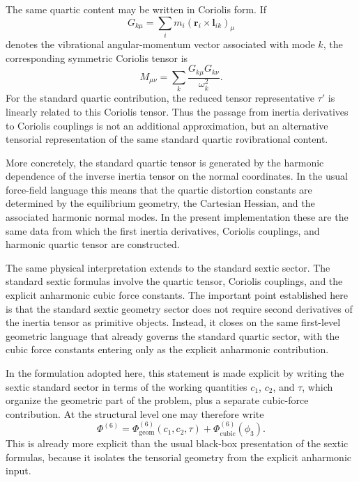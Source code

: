 The same quartic content may be written in Coriolis form. If
\begin{equation}
G_{k\mu}=\sum_i m_i\left(\mathbf r_i\times \mathbf l_{ik}\right)_\mu
\end{equation}
denotes the vibrational angular-momentum vector associated with mode
$k$, the corresponding symmetric Coriolis tensor is
\begin{equation}
M_{\mu\nu}=\sum_k\frac{G_{k\mu}G_{k\nu}}{\omega_k^2}.
\end{equation}
For the standard quartic contribution, the reduced tensor
representative $\tau'$ is linearly related to this Coriolis tensor.
Thus the passage from inertia derivatives to Coriolis couplings is not
an additional approximation, but an alternative tensorial
representation of the same standard quartic rovibrational content.

More concretely, the standard quartic tensor is generated by the
harmonic dependence of the inverse inertia tensor on the normal
coordinates. In the usual force-field language this means that the
quartic distortion constants are determined by the equilibrium
geometry, the Cartesian Hessian, and the associated harmonic normal
modes. In the present implementation these are the same data from
which the first inertia derivatives, Coriolis couplings, and harmonic
quartic tensor are constructed.

The same physical interpretation extends to the standard sextic
sector. The standard sextic formulas involve the quartic tensor,
Coriolis couplings, and the explicit anharmonic cubic force
constants. The important point established here is that the standard
sextic geometry sector does not require second derivatives of the
inertia tensor as primitive objects. Instead, it closes on the same
first-level geometric language that already governs the standard
quartic sector, with the cubic force constants entering only as the
explicit anharmonic contribution.

In the formulation adopted here, this statement is made explicit by
writing the sextic standard sector in terms of the working quantities
$c_1$, $c_2$, and $\tau$, which organize the geometric part of the
problem, plus a separate cubic-force contribution. At the structural
level one may therefore write
\begin{equation}
\Phi^{(6)} = \Phi^{(6)}_{\mathrm{geom}}(c_1,c_2,\tau)
+ \Phi^{(6)}_{\mathrm{cubic}}(\phi_3).
\end{equation}
This is already more explicit than the usual black-box presentation of
the sextic formulas, because it isolates the tensorial geometry from
the explicit anharmonic input.

